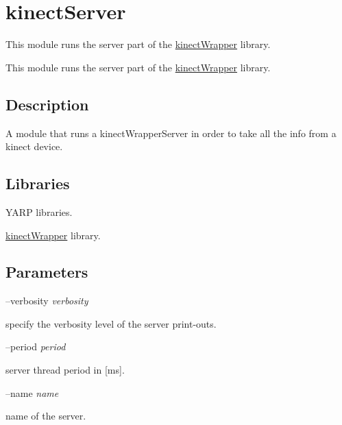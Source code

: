 \section{kinect\+Server}
\label{group__kinectServer}


This module runs the server part of the \hyperlink{group__kinectWrapper}{kinect\+Wrapper} library.  


This module runs the server part of the \hyperlink{group__kinectWrapper}{kinect\+Wrapper} library. 

\hypertarget{group__kinectServer_intro_sec}{}\subsection{Description}\label{group__kinectServer_intro_sec}
A module that runs a kinect\+Wrapper\+Server in order to take all the info from a kinect device.\hypertarget{group__kinectServer_lib_sec}{}\subsection{Libraries}\label{group__kinectServer_lib_sec}

\begin{DoxyItemize}
\item Y\+A\+R\+P libraries.
\item \hyperlink{group__kinectWrapper}{kinect\+Wrapper} library.
\end{DoxyItemize}\hypertarget{group__kinectServer_parameters_sec}{}\subsection{Parameters}\label{group__kinectServer_parameters_sec}
--verbosity {\itshape verbosity} 
\begin{DoxyItemize}
\item specify the verbosity level of the server print-\/outs.
\end{DoxyItemize}

--period {\itshape period} 
\begin{DoxyItemize}
\item server thread period in \mbox{[}ms\mbox{]}.
\end{DoxyItemize}

--name {\itshape name} 
\begin{DoxyItemize}
\item name of the server.
\end{DoxyItemize}

